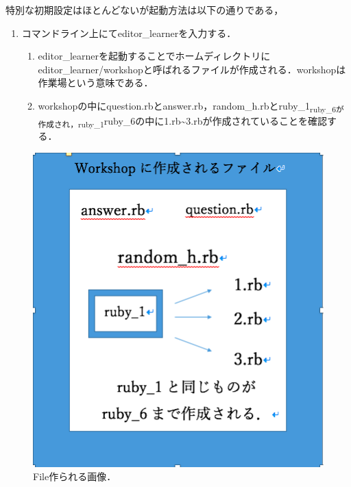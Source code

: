 \documentclass[11pt,dvipdfmx]{jsarticle}
\providecommand{\tightlist}{%
      \setlength{\itemsep}{0pt}\setlength{\parskip}{0pt}}
\begin{document}
    特別な初期設定はほとんどないが起動方法は以下の通りである，

\begin{enumerate}
\def\labelenumi{\arabic{enumi}.}
\tightlist
\item
  コマンドライン上にてeditor\_learnerを入力する．

  \begin{enumerate}
  \def\labelenumii{\arabic{enumii}.}
  \setcounter{enumii}{1}
  \tightlist
  \item
    editor\_learnerを起動することでホームディレクトリにeditor\_learner/workshopと呼ばれるファイルが作成される．workshopは作業場という意味である．
  \item
    workshopの中にquestion.rbとanswer.rb，random\_h.rbとruby\_1\textsubscript{ruby\_6が作成され，ruby\_1}ruby\_6の中に1.rb\textasciitilde{}3.rbが作成されていることを確認する．
  \end{enumerate}
\end{enumerate}

\begin{figure}[H]
\centering
\begin{center}
\includegraphics[width=150mm]{../../picture/mkdir.png}
\end{center}
\caption{File作られる画像．\label{sample}}

\label{fig:This}
\end{figure}
\end{document}
